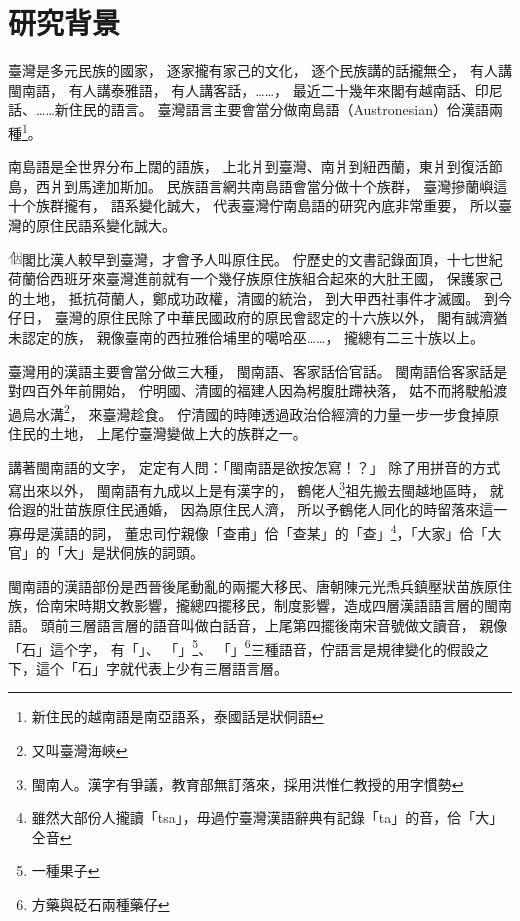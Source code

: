\chapter{研究背景}
\label{章：研究背景}
臺灣是多元民族的國家，
逐家攏有家己的文化，
逐个民族講的話攏無仝，
有人講閩南語，
有人講泰雅語，
有人講客話，……，
最近二十幾年來閣有越南話、印尼話、……新住民的語言。
臺灣語言主要會當分做南島語（Austronesian）佮漢語兩種\footnote{新住民的越南語是南亞語系，泰國話是狀侗語}。%

南島語是全世界分布上闊的語族\cite{臺灣原住民史李壬癸}，
上北爿到臺灣、南爿到紐西蘭，東爿到復活節島，西爿到馬達加斯加。
民族語言網\cite{Ethnologue}共南島語會當分做十个族群，
臺灣摻蘭嶼這十个族群攏有，
語系變化誠大，
代表臺灣佇南島語的研究內底非常重要，
所以臺灣的原住民語系變化誠大。

\includegraphics[height=1em]{字/⿰因}閣比漢人較早到臺灣，才會予人叫原住民。
佇歷史的文書記錄面頂，十七世紀荷蘭佮西班牙來臺灣進前就有一个幾仔族原住族組合起來的大肚王國\cite{大肚王國}，%
保護家己的土地，
抵抗荷蘭人，鄭成功政權，清國的統治，
到大甲西社事件才滅國。
到今仔日，
臺灣的原住民除了中華民國政府的原民會認定的十六族以外，
閣有誠濟猶未認定的族，
親像臺南的西拉雅佮埔里的噶哈巫……，
攏總有二三十族以上。

臺灣用的漢語主要會當分做三大種，
閩南語、客家話佮官話\cite{外省族群的母語與國語}。
閩南語佮客家話是對四百外年前開始，
佇明國、清國的福建人因為枵腹肚蹛袂落，
姑不而將駛船渡過烏水溝\footnote{又叫臺灣海峽}，
來臺灣趁食。
佇清國的時陣透過政治佮經濟的力量一步一步食掉原住民的土地，
上尾佇臺灣變做上大的族群之一。

講著閩南語的文字，
定定有人問：「閩南語是欲按怎寫！？」
除了用拼音的方式寫出來以外，
閩南語有九成以上是有漢字的\cite{洪惟仁閩南語九成有漢字}，
鶴佬人\footnote{閩南人。漢字有爭議，教育部無訂落來，採用洪惟仁教授的用字慣勢}祖先搬去閩越地區時，
就佮遐的壯苗族原住民通婚，
因為原住民人濟，
所以予鶴佬人同化的時留落來這一寡毋是漢語的詞，
董忠司佇\cite{董忠司}親像「查甫」佮「查某」的「查」\footnote{雖然大部份人攏讀「tsa」，毋過佇臺灣漢語辭典\cite{臺灣漢語辭典}有記錄「ta」的音，佮「大」仝音}，「大家」佮「大官」的「大」是狀侗族的詞頭。

閩南語的漢語部份是西晉後尾動亂的兩擺大移民、唐朝陳元光𤆬兵鎮壓狀苗族原住族，佮南宋時期文教影響，攏總四擺移民，制度影響，造成四層漢語語言層的閩南語\cite{閩客方言史稿}。
頭前三層語言層的語音叫做白話音，上尾第四擺後南宋音號做文讀音，
親像「石」這个字，
有「」、
「」\footnote{一種果子}、
「」\footnote{方藥與砭石兩種藥仔}三種語音，佇語言是規律變化的假設之下，這个「石」字就代表上少有三層語言層。

